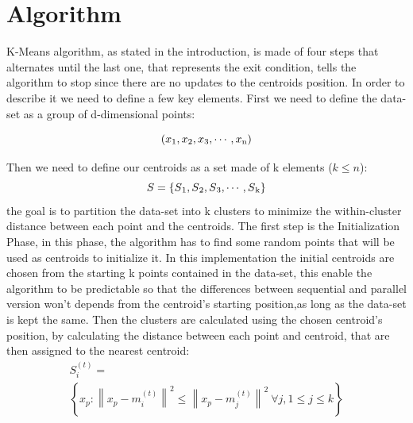 \documentclass[10pt,twocolumn,letterpaper]{article}
\begin{document}
\vspace{3cm}

\section{Algorithm}

K-Means algorithm, as stated in the introduction, is made of four steps that alternates until the last one, that represents 
the exit condition, tells the algorithm to stop since there are no updates to the centroids position.\newline
In order to describe it we need to define a few key elements.\newline
First we need to define the data-set as a group of d-dimensional points:\newline

\begin{equation} 
\label{eq:Data-Set}
(x\textsubscript{1},x\textsubscript{2},x\textsubscript{3},\cdots,x\textsubscript{n})
\end{equation}

Then we need to define our centroids as a set made of k elements ($k \leq n$):\newline
\begin{equation} 
\label{eq:Data-Set}
S=\{S\textsubscript{1},S\textsubscript{2},S\textsubscript{3},\cdots,S\textsubscript{k}\}
\end{equation}
the goal is to partition the data-set into k clusters to minimize the within-cluster distance between each point and the centroids.
\newline
The first step is the Initialization Phase, in this phase, the algorithm has to find some random points that will be used as 
centroids to initialize it.\newline
In this implementation the initial centroids are chosen from the starting k points contained in the data-set, this enable the 
algorithm to be predictable so that the differences between sequential and parallel version won't depends from the centroid's 
starting position,as long as the data-set is kept the same.
\newline
Then the clusters are calculated using the chosen centroid's position, by calculating the distance between each point and 
centroid, that are then assigned to the nearest centroid:\newline
\begin{multline}
\label{eq:Centroids}
S_i^{(t)} =\\
\left \{ x_p : \left \| x_p - m^{(t)}_i \right \|^2 \le \left \| x_p - m^{(t)}_j \right \|^2 \ \forall j, 1 \le j \le k \right\}\\
\end{multline}
\end{document}
